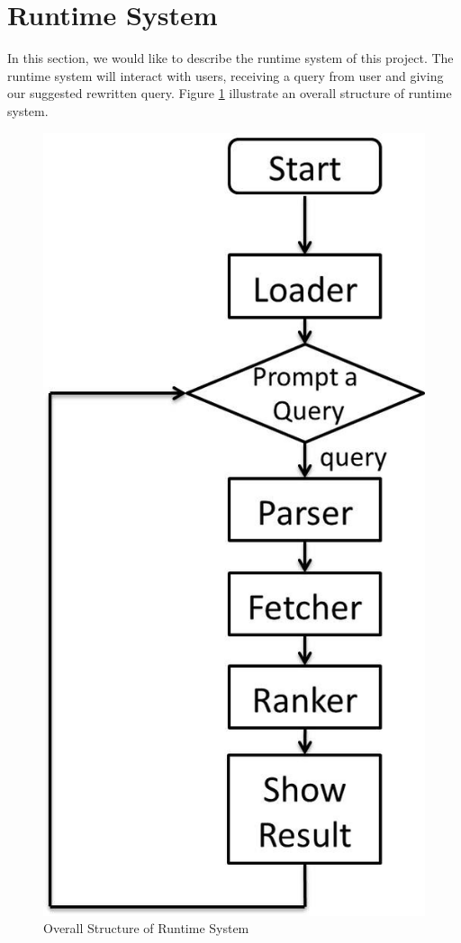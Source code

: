 \section{Runtime System}
In this section, we would like to describe the runtime system of this project. The runtime system will interact with users, receiving a query from user and giving our suggested rewritten query. Figure \ref{fig:system} illustrate an overall structure of runtime system.

\begin{figure}
  \centering
  \includegraphics[scale=0.2]{images/system}
  \caption{Overall Structure of Runtime System}
  \label{fig:system}
\end{figure}

